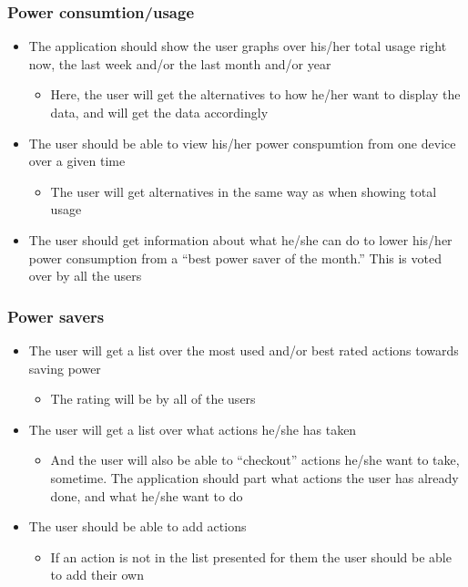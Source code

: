 \subsubsection{Power consumtion/usage}

\begin{itemize}
\item The application should show the user graphs over his/her total usage right now, the last week and/or the last month and/or year
\begin{itemize}
\item Here, the user will get the alternatives to how he/her want to display the data, and will get the data accordingly
\end{itemize}
\item The user should be able to view his/her power conspumtion from one device over a given time
\begin{itemize}
\item The user will get alternatives in the same way as when showing total usage
\end{itemize}
\item The user should get information about what he/she can do to lower his/her power consumption from a “best power saver of the month.” This is voted over by all the users
\end{itemize}

\subsubsection{Power savers}

\begin{itemize}
\item The user will get a list over the most used and/or best rated actions towards saving power
\begin{itemize}
\item The rating will be by all of the users
\end{itemize}
\item The user will get a list over what actions he/she has taken
\begin{itemize}
\item And the user will also be able to “checkout” actions he/she want to take, sometime. The application should part what actions the user has already done, and what he/she want to do
\end{itemize}
\item The user should be able to add actions
\begin{itemize}
\item If an action is not in the list presented for them the user should be able to add their own
\end{itemize}
\end{itemize}


